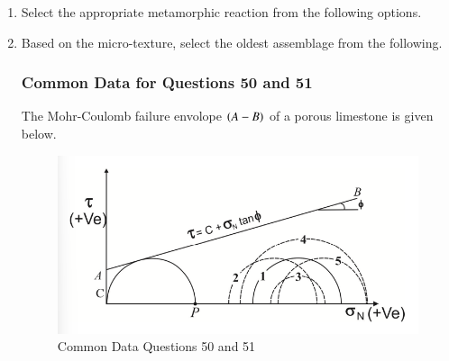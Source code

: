 \documentclass[journal,12pt,onecolumn]{IEEEtran}
\theoremstyle{remark}
\begin{document}
\begin{enumerate}
        \item Select the appropriate metamorphic reaction from the following options. \hfill{}
            \begin{enumerate}
            \end{enumerate}

        \item Based on the micro-texture, select the oldest assemblage from the following. \hfill{}
            \begin{enumerate}
            \end{enumerate}
    \newpage
\subsubsection*{Common Data for Questions 50 and 51}
The Mohr-Coulomb failure envolope $\left(A-B\right)$ of a porous limestone is given below. 

        \begin{figure}[h]
            \centering
            \includegraphics[width=1\linewidth]{Figs/fig5.png}
            \caption{Common Data Questions 50 and 51}
            \label{fig:placeholder_5}
        \end{figure}


\end{enumerate}
\end{document}
